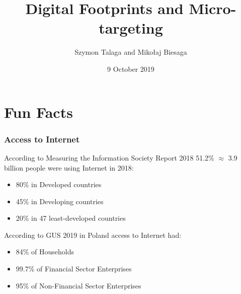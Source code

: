\title[Digital Footprints \& Micro-targeting]{
    Digital Footprints and Micro-targeting
}
\author[]{Szymon Talaga and Mikołaj Biesaga} %
\date{9 October 2019} %

\frame{\titlepage}

\section[Fun Facts]{Fun Facts}

\begin{frame}
    \frametitle{Access to Internet}
    According to Measuring the Information Society Report 2018 51.2\% $\approx$ 3.9 billion people were using Internet in 2018:
        \begin{itemize}
            \item 80\% in Developed countries
            \item 45\% in Developing countries
            \item 20\% in 47 least-developed countries
        \end{itemize}
    According to GUS 2019 in Poland access to Internet had:
        \begin{itemize}
            \item 84\% of Households
            \item 99.7\% of Financial Sector Enterprises
            \item 95\% of Non-Financial Sector Enterprises
        \end{itemize}
\end{frame}

